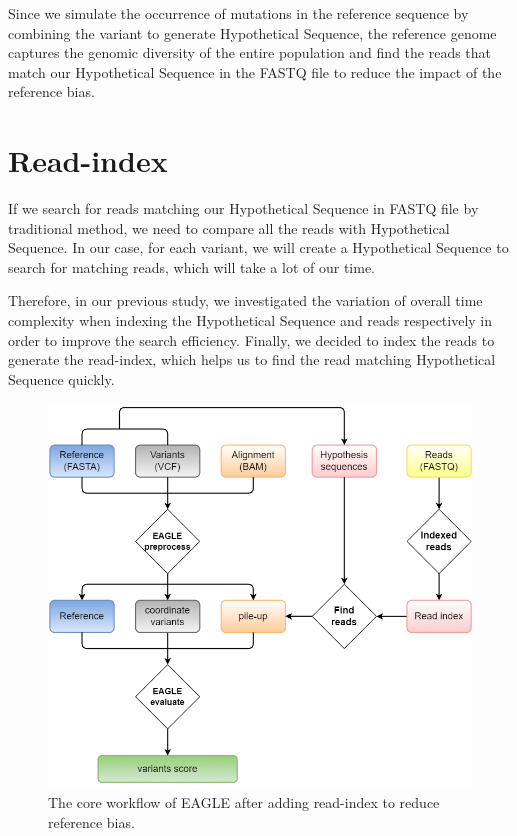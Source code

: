 \documentclass[PhD]{PHlab-thesis}
\begin{document}
Since we simulate the occurrence of mutations in the reference sequence by combining the variant to generate Hypothetical Sequence, the reference genome captures the genomic diversity of the entire population and find the reads that match our Hypothetical Sequence in the FASTQ file to reduce the impact of the reference bias.
\section{Read-index}
If we search for reads matching our Hypothetical Sequence in FASTQ file by traditional method, we need to compare all the reads with Hypothetical Sequence. In our case, for each variant, we will create a Hypothetical Sequence to search for matching reads, which will take a lot of our time.

Therefore, in our previous study, we investigated the variation of overall time complexity when indexing the Hypothetical Sequence and reads respectively in order to improve the search efficiency. Finally, we decided to index the reads to generate the read-index, which helps us to find the read matching Hypothetical Sequence quickly.

\begin{figure}[h!]
	\centering
	\includegraphics[scale=0.7]{figures/EAGLE after.png}
	\caption{The core workflow of EAGLE after adding read-index to reduce reference bias.}
	\label{fig:EAGLE with read-index} %
\end{figure}
\end{document}
